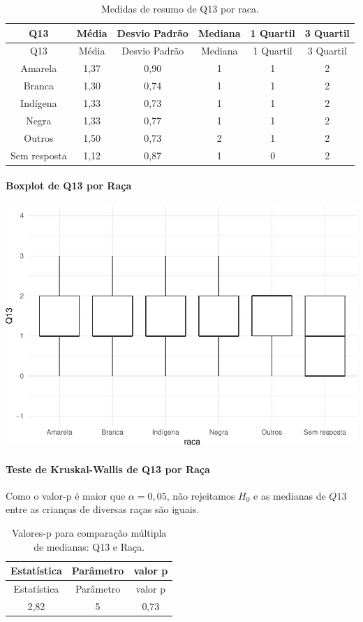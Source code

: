 \documentclass[]{article}
\let\oldparagraph\paragraph
\renewcommand{\paragraph}[1]{\oldparagraph{#1}\mbox{}}
\begin{document}
\begin{longtable}[]{@{}cccccc@{}}
\caption{\label{tab:unnamed-chunk-79}Medidas de resumo de Q13 por raca.}\tabularnewline
\toprule
Q13 & Média & Desvio Padrão & Mediana & 1 Quartil & 3 Quartil\tabularnewline
\midrule
\endfirsthead
\toprule
Q13 & Média & Desvio Padrão & Mediana & 1 Quartil & 3 Quartil\tabularnewline
\midrule
\endhead
Amarela & 1,37 & 0,90 & 1 & 1 & 2\tabularnewline
Branca & 1,30 & 0,74 & 1 & 1 & 2\tabularnewline
Indígena & 1,33 & 0,73 & 1 & 1 & 2\tabularnewline
Negra & 1,33 & 0,77 & 1 & 1 & 2\tabularnewline
Outros & 1,50 & 0,73 & 2 & 1 & 2\tabularnewline
Sem resposta & 1,12 & 0,87 & 1 & 0 & 2\tabularnewline
\bottomrule
\end{longtable}

\hypertarget{boxplot-de-q13-por-rauxe7a}{%
\paragraph{Boxplot de Q13 por Raça}\label{boxplot-de-q13-por-rauxe7a}}

\begin{center}\includegraphics[width=0.75\linewidth]{relatorio_files/figure-latex/unnamed-chunk-80-1} \end{center}

\hypertarget{teste-de-kruskal-wallis-de-q13-por-rauxe7a}{%
\paragraph{Teste de Kruskal-Wallis de Q13 por Raça}\label{teste-de-kruskal-wallis-de-q13-por-rauxe7a}}

Como o valor-p é maior que \(\alpha=0,05\), não rejeitamos \(H_0\) e as medianas de \(Q13\) entre as crianças de diversas raças são iguais.

\begin{longtable}[]{@{}ccc@{}}
\caption{\label{tab:unnamed-chunk-81}Valores-p para comparação múltipla de medianas: Q13 e Raça.}\tabularnewline
\toprule
Estatística & Parâmetro & valor p\tabularnewline
\midrule
\endfirsthead
\toprule
Estatística & Parâmetro & valor p\tabularnewline
\midrule
\endhead
2,82 & 5 & 0,73\tabularnewline
\bottomrule
\end{longtable}
\end{document}
